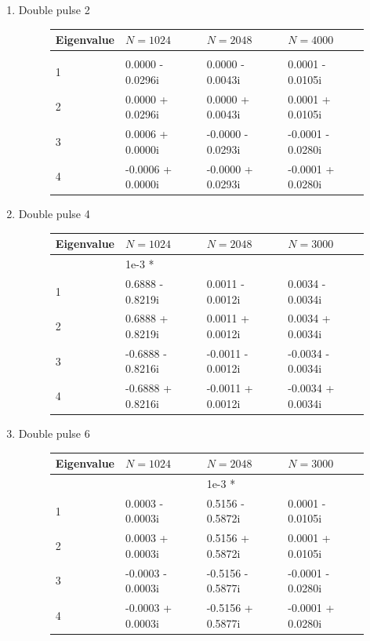 \documentclass[12pt]{article}
\begin{document}
\begin{enumerate}

\item Double pulse 2
\begin{figure}[H]
\begin{tabular}{l|lll}
Eigenvalue & $N = 1024$ & $N = 2048$  & $N = 4000$\\ \hline
           &                    &                    &                      \\
1          &   0.0000 - 0.0296i &   0.0000 - 0.0043i &     0.0001 - 0.0105i \\
2          &   0.0000 + 0.0296i &   0.0000 + 0.0043i &     0.0001 + 0.0105i \\
3          &   0.0006 + 0.0000i &  -0.0000 - 0.0293i &    -0.0001 - 0.0280i \\
4          &  -0.0006 + 0.0000i &  -0.0000 + 0.0293i &    -0.0001 + 0.0280i \\       
\end{tabular}
\end{figure}

\item Double pulse 4
\begin{figure}[H]
\begin{tabular}{l|lll}
Eigenvalue & $N = 1024$ & $N = 2048$  & $N = 3000$\\ \hline
           &    1e-3 *            &                    &                      \\
1          &     0.6888 - 0.8219i &   0.0011 - 0.0012i &   0.0034 - 0.0034i \\
2          &     0.6888 + 0.8219i &   0.0011 + 0.0012i &   0.0034 + 0.0034i \\
3          &    -0.6888 - 0.8216i &  -0.0011 - 0.0012i &  -0.0034 - 0.0034i \\
4          &    -0.6888 + 0.8216i &  -0.0011 + 0.0012i &  -0.0034 + 0.0034i \\       
\end{tabular}
\end{figure}

\item Double pulse 6
\begin{figure}[H]
\begin{tabular}{l|lll}
Eigenvalue & $N = 1024$ & $N = 2048$  & $N = 3000$\\ \hline
           &                    &    1e-3 *           &                      \\
1          &     0.0003 - 0.0003i &    0.5156 - 0.5872i &     0.0001 - 0.0105i \\
2          &     0.0003 + 0.0003i &    0.5156 + 0.5872i &     0.0001 + 0.0105i \\
3          &    -0.0003 - 0.0003i &   -0.5156 - 0.5877i &    -0.0001 - 0.0280i \\
4          &    -0.0003 + 0.0003i &   -0.5156 + 0.5877i &    -0.0001 + 0.0280i \\       
\end{tabular}
\end{figure}


\end{enumerate}
\end{document}
